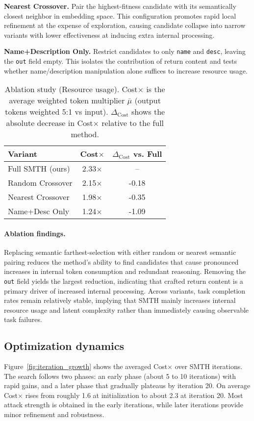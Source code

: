 \textbf{Nearest Crossover.} Pair the highest-fitness candidate with its semantically closest neighbor in embedding space. This configuration promotes rapid local refinement at the expense of exploration, causing candidate collapse into narrow variants with lower effectiveness at inducing extra internal processing.

\textbf{Name+Description Only.} Restrict candidates to only \texttt{name} and \texttt{desc}, leaving the \texttt{out} field empty. This isolates the contribution of return content and tests whether name/description manipulation alone suffices to increase resource usage.

\begin{table}[t]
  \centering
  \begin{tabular}{lcc}
    \hline
    \textbf{Variant} & \textbf{Cost$\times$} & $\Delta_{\text{Cost}}$ vs. Full \\
    \hline
    Full SMTH (ours)      & 2.33$\times$  & -- \\
    Random Crossover      & 2.15$\times$  & -0.18 \\
    Nearest Crossover     & 1.98$\times$  & -0.35 \\
    Name+Desc Only        & 1.24$\times$   & -1.09 \\
    \hline
  \end{tabular}
  \caption{Ablation study (Resource usage). Cost$\times$ is the average weighted token multiplier $\bar\mu$ (output tokens weighted 5:1 vs input). $\Delta_{\text{Cost}}$ shows the absolute decrease in Cost$\times$ relative to the full method.}
  \label{tab:ablation_costs}
\end{table}

\paragraph{Ablation findings.}
Replacing semantic farthest-selection with either random or nearest semantic pairing reduces the method's ability to find candidates that cause pronounced increases in internal token consumption and redundant reasoning. Removing the \texttt{out} field yields the largest reduction, indicating that crafted return content is a primary driver of increased internal processing. Across variants, task completion rates remain relatively stable, implying that SMTH mainly increases internal resource usage and latent complexity rather than immediately causing observable task failures.

\subsection{Optimization dynamics}
Figure~\ref{fig:iteration_growth} shows the averaged Cost$\times$ over SMTH iterations. The search follows two phases: an early phase (about 5 to 10 iterations) with rapid gains, and a later phase that gradually plateaus by iteration 20. On average Cost$\times$ rises from roughly 1.6 at initialization to about 2.3 at iteration 20. Most attack strength is obtained in the early iterations, while later iterations provide minor refinement and robustness.

